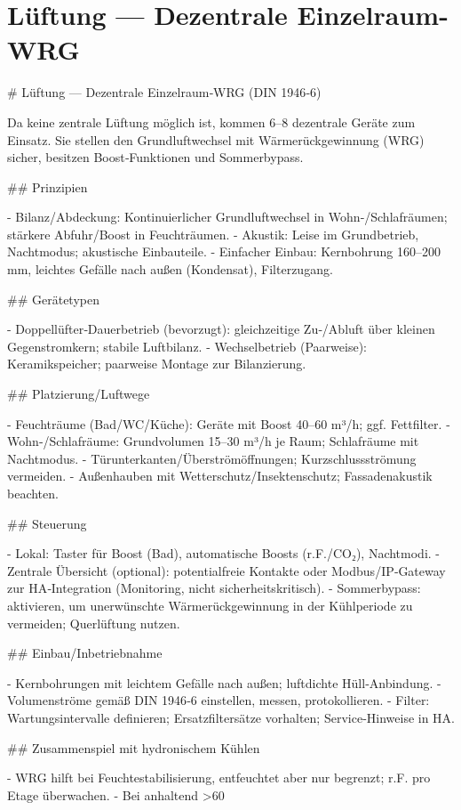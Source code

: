 \documentclass[11pt,oneside]{report}
\begin{document}
\chapter{Lüftung — Dezentrale Einzelraum-WRG}
\begin{markdown}
# Lüftung — Dezentrale Einzelraum‑WRG (DIN 1946‑6)

Da keine zentrale Lüftung möglich ist, kommen 6–8 dezentrale Geräte zum Einsatz. Sie stellen den Grundluftwechsel mit Wärmerückgewinnung (WRG) sicher, besitzen Boost‑Funktionen und Sommerbypass.

## Prinzipien

- Bilanz/Abdeckung: Kontinuierlicher Grundluftwechsel in Wohn‑/Schlafräumen; stärkere Abfuhr/Boost in Feuchträumen.
- Akustik: Leise im Grundbetrieb, Nachtmodus; akustische Einbauteile.
- Einfacher Einbau: Kernbohrung 160–200 mm, leichtes Gefälle nach außen (Kondensat), Filterzugang.

## Gerätetypen

- Doppellüfter‑Dauerbetrieb (bevorzugt): gleichzeitige Zu‑/Abluft über kleinen Gegenstromkern; stabile Luftbilanz.
- Wechselbetrieb (Paarweise): Keramikspeicher; paarweise Montage zur Bilanzierung.

## Platzierung/Luftwege

- Feuchträume (Bad/WC/Küche): Geräte mit Boost 40–60 m³/h; ggf. Fettfilter.
- Wohn‑/Schlafräume: Grundvolumen 15–30 m³/h je Raum; Schlafräume mit Nachtmodus.
- Türunterkanten/Überströmöffnungen; Kurzschlussströmung vermeiden.
- Außenhauben mit Wetterschutz/Insektenschutz; Fassadenakustik beachten.

## Steuerung

- Lokal: Taster für Boost (Bad), automatische Boosts (r.F./CO₂), Nachtmodi.
- Zentrale Übersicht (optional): potentialfreie Kontakte oder Modbus/IP‑Gateway zur HA‑Integration (Monitoring, nicht sicherheitskritisch).
- Sommerbypass: aktivieren, um unerwünschte Wärmerückgewinnung in der Kühlperiode zu vermeiden; Querlüftung nutzen.

## Einbau/Inbetriebnahme

- Kernbohrungen mit leichtem Gefälle nach außen; luftdichte Hüll‑Anbindung.
- Volumenströme gemäß DIN 1946‑6 einstellen, messen, protokollieren.
- Filter: Wartungsintervalle definieren; Ersatzfiltersätze vorhalten; Service‑Hinweise in HA.

## Zusammenspiel mit hydronischem Kühlen

- WRG hilft bei Feuchtestabilisierung, entfeuchtet aber nur begrenzt; r.F. pro Etage überwachen.
- Bei anhaltend >60 %
\end{markdown}
\end{document}
